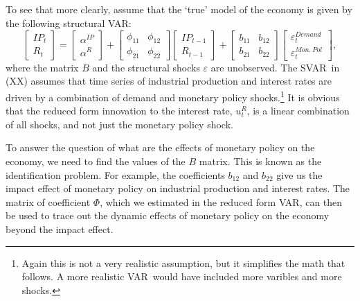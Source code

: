 \documentclass[10pt]{article}
\begin{document}
To see that more clearly, assume that the `true' model of the economy is
given by the following structural VAR:%
\begin{equation}
\begin{bmatrix}
IP_{t} \\
R_{t}%
\end{bmatrix}%
=%
\begin{bmatrix}
\alpha ^{IP} \\
\alpha ^{R}%
\end{bmatrix}%
+\left[
\begin{array}{cc}
\phi _{11} & \phi _{12} \\
\phi _{21} & \phi _{22}%
\end{array}%
\right]
\begin{bmatrix}
IP_{t-1} \\
R_{t-1}%
\end{bmatrix}%
+\left[
\begin{array}{cc}
b_{11} & b_{12} \\
b_{21} & b_{22}%
\end{array}%
\right]
\begin{bmatrix}
\varepsilon _{t}^{Demand} \\
\varepsilon _{t}^{Mon.\ Pol}%
\end{bmatrix}%
,  \label{eq:struct_2var}
\end{equation}%
where the matrix $B$ and the structural shocks $\varepsilon $ are
unobserved. The SVAR\ in (XX) assumes that time series of industrial
production and interest rates are driven by a combination of demand and
monetary policy shocks.\footnote{%
Again this is not a very realistic assumption, but it simplifies the math
that follows. A more realistic VAR\ would have included more varibles and
more shocks.} It is obvious that the reduced form innovation to the interest
rate, $u_{t}^{R}$, is a linear combination of all shocks, and not just the
monetary policy shock.

To answer the question of what are the effects of monetary policy on the
economy, we need to find the values of the $B$ matrix. This is known as the
identification problem. For example, the coefficients $b_{12}$ and $b_{22}$
give us the impact effect of monetary policy on industrial production and
interest rates. The matrix of coefficient $\Phi $, which we estimated in the
reduced form VAR, can then be used to trace out the dynamic effects of
monetary policy on the economy beyond the impact effect.
\end{document}
